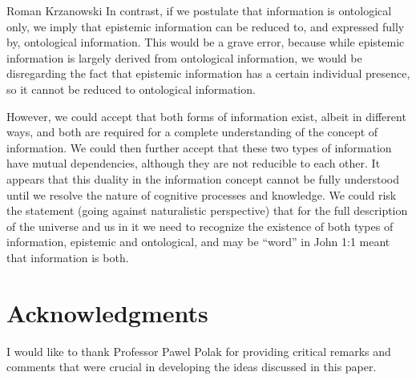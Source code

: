 \begin{artengenv}{Roman Krzanowski}
In contrast, if we postulate that information is ontological only, we imply that epistemic information can be reduced to, and expressed fully by, ontological information. This would be a grave error, because while epistemic information is largely derived from ontological information, we would be disregarding the fact that epistemic information has a certain individual presence, so it cannot be reduced to ontological information.

However, we could accept that both forms of information exist, albeit in different ways, and both are required for a complete understanding of the concept of information. We could then further accept that these two types of information have mutual dependencies, although they are not reducible to each other. It appears that this duality in the information concept cannot be fully understood until we resolve the nature of cognitive processes and knowledge. We could risk the statement (going against naturalistic perspective) that for the full description of the universe and us in it
\parencite[][]{tallis_mystery_2016} %
 we need to recognize the existence of both types of information, epistemic and ontological, and may be ``word'' in John 1:1 meant that information is both.

\section{Acknowledgments}
I would like to thank Professor Pawel Polak for providing critical remarks and comments that were crucial in developing the ideas discussed in this paper.



\end{artengenv}